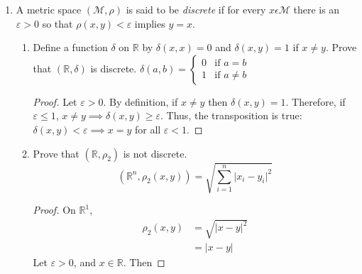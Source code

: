 \documentclass{article}
\begin{document}
\begin{enumerate}
\begin{proof}
\begin{enumerate}
                  \end{enumerate}
            \end{proof}
            \setcounter{enumi}{9}
      \item A metric space $(\mathcal{M}, \rho)$ is said to be \textit{discrete}
            if for every $x\epsilon\mathcal{M}$ there is an $\varepsilon>0$ so
            that $\rho(x, y)<\varepsilon$ implies $y=x$.
            \begin{enumerate}
                  \item Define a function $\delta$ on $\mathbb{R}$ by
                        $\delta(x,x)=0$ and $\delta(x, y)=1$ if $x\neq y$. Prove
                        that $(\mathbb{R}, \delta)$ is discrete.
                        \medbreak
                        $\delta(a,b)=\begin{cases}
                                    0 & \textrm{if } a = b    \\
                                    1 & \textrm{if } a \neq b
                              \end{cases}$
                        \begin{proof}
                              Let $\varepsilon>0$. By definition, if $x\neq y$ then
                              $\delta(x,y)=1$. Therefore, if $\varepsilon\leq 1$,
                              $x\neq y\implies \delta(x,y)\geq\varepsilon$.
                              Thus, the transposition is true:
                              $\delta(x,y)<\varepsilon\implies x=y$ for all $\varepsilon<1$.
                        \end{proof}
                  \item Prove that $(\mathbb{R}, \rho_2)$ is not discrete.
                        \begin{equation}
                              (\mathbb{R}^n,\rho_2(x,y)) = \sqrt{\sum_{i=1}^n\lvert x_i-y_i\rvert^2}
                        \end{equation}
                        \begin{proof}
                              On $\mathbb{R}^1$,
                              \begin{align*}
                                    \rho_2(x,y) & = \sqrt{\lvert x-y\rvert^2} \\
                                                & = \lvert x-y\rvert
                              \end{align*}
                              Let $\varepsilon>0$, and $x\in\mathbb{R}$. Then

\end{proof}
\end{enumerate}
\end{enumerate}
\end{document}

